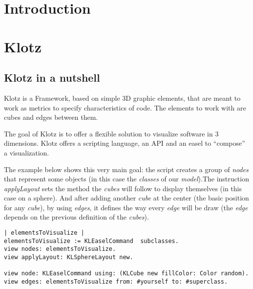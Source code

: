 \documentclass[runningheads]{llncs}
\newcommand{\seclabel}[1]{\label{sec:#1}}
\begin{document}

\section{Introduction} \seclabel{introduction}


\section{Klotz} \seclabel{klotz}

\subsection{Klotz in a nutshell} \seclabel{nutshell}
Klotz is a Framework, based on simple 3D graphic elements,
that are meant to work as metrics to specify characteristics of
code. The elements to work with are cubes and edges between them.

The goal of Klotz is to offer a flexible solution to visualize software 
in 3 dimensions. Klotz offers a scripting language, an API and an easel to 
``compose'' a visualization. 

The example below shows this very main goal: the script creates a group of
\emph{nodes} that represent some objects (in this case the \emph{classes} 
of our \emph{model}).The instruction \emph{applyLayout} sets the method 
the \emph{cubes} will follow to display themselves (in this case on a 
sphere). And after adding another \emph{cube} at the center (the basic 
position for any \emph{cube}), by using \emph{edges}, it defines the way 
every \emph{edge} will be draw (the \emph{edge} depends on the previous 
definition of the \emph{cubes}).

\begin{lstlisting}
| elementsToVisualize |
elementsToVisualize := KLEaselCommand  subclasses.
view nodes: elementsToVisualize.
view applyLayout: KLSphereLayout new.

view node: KLEaselCommand using: (KLCube new fillColor: Color random).
view edges: elementsToVisualize from: #yourself to: #superclass.   
\end{lstlisting}
\end{document}

